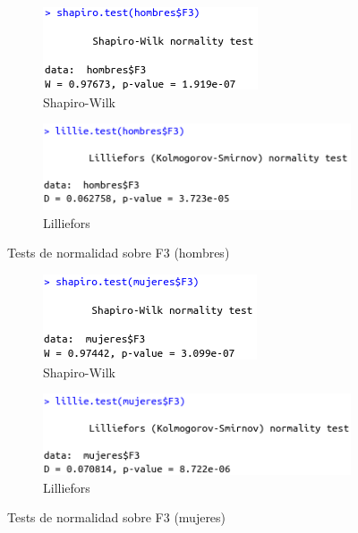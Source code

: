 \begin{figure}[H]
	\centering
	\begin{subfigure}{.5\textwidth}
		\centering
		\includegraphics[width=.6\linewidth]{swh-F3.png}
		\caption{Shapiro-Wilk}
		\label{fig:swh-F3}
	\end{subfigure}%
	\begin{subfigure}{.5\textwidth}
		\centering
		\includegraphics[width=.6\linewidth]{lh-F3.png}
		\caption{Lilliefors}
		\label{fig:lh-F3}
	\end{subfigure}
	\caption{Tests de normalidad sobre F3 (hombres)}
	\label{fig:normhF3}
\end{figure}

\begin{figure}[H]
	\centering
	\begin{subfigure}{.5\textwidth}
		\centering
		\includegraphics[width=.6\linewidth]{swm-F3.png}
		\caption{Shapiro-Wilk}
		\label{fig:swm-F3}
	\end{subfigure}%
	\begin{subfigure}{.5\textwidth}
		\centering
		\includegraphics[width=.6\linewidth]{lm-F3.png}
		\caption{Lilliefors}
		\label{fig:lm-F3}
	\end{subfigure}
	\caption{Tests de normalidad sobre F3 (mujeres)}
	\label{fig:normmF3}
\end{figure}

